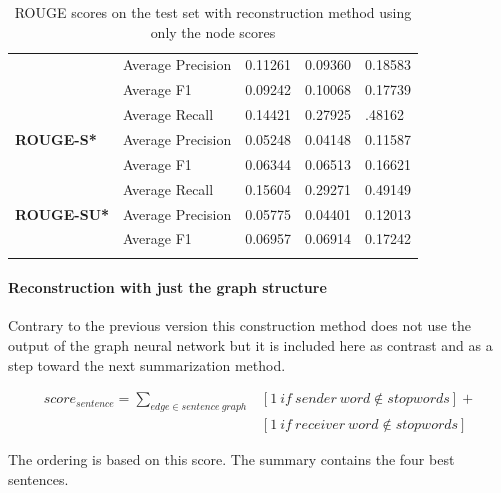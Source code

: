 \begin{longtable}{| l | l | l | l | l |}
		&Average Precision&0.11261&0.09360&0.18583 \\
		&Average F1&0.09242&0.10068&0.17739 \\ \hline \hline
	\multirow{3}{*}{\textbf{ROUGE-S*}}
		&Average Recall&0.14421&0.27925&.48162 \\
		&Average Precision&0.05248&0.04148&0.11587 \\
		&Average F1&0.06344&0.06513&0.16621 \\ \hline \hline
	\multirow{3}{*}{\textbf{ROUGE-SU*}}
		&Average Recall&0.15604&0.29271&0.49149 \\
		&Average Precision&0.05775&0.04401&0.12013 \\
		&Average F1&0.06957&0.06914&0.17242 \\ \hline
	\caption{ROUGE scores on the test set with reconstruction method using only the node scores}
\end{longtable}

\paragraph{Reconstruction with just the graph structure}

Contrary to the previous version this construction method does not use the output of the graph neural network but it is included here as contrast and as a step toward the next summarization method.

\begin{eqnarray*}
	score_{sentence} = \sum_{edge \in sentence\ graph} &[1\ if\ sender\ word \notin stopwords] + \\&[1\ if\ receiver\ word \notin stopwords]
\end{eqnarray*}

The ordering is based on this score. The summary contains the four best sentences.

